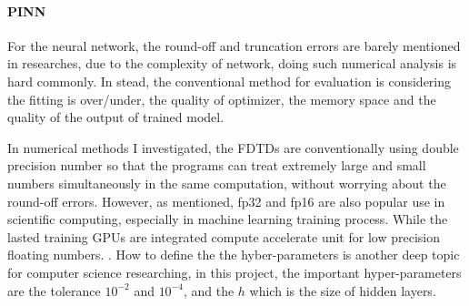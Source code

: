 \paragraph{PINN}
For the neural network, the round-off and truncation errors are barely mentioned in researches, 
due to the complexity of network, doing such numerical analysis is hard commonly.
In stead, the conventional method for evaluation is considering the fitting is over/under, the quality of optimizer, the memory space and the quality of 
the output of trained model.

In numerical methods I investigated, the FDTDs are conventionally using double precision number so that the programs can treat extremely large and small 
numbers simultaneously in the same computation, without worrying about the round-off errors.
However, as mentioned, fp32 and fp16 are also popular use in scientific computing, especially in machine learning training process. 
While the lasted training GPUs are integrated compute accelerate unit for low precision floating numbers. \cite{NVIDIA_HB200_PAPER}.
How to define the the hyber-parameters is another deep topic for computer science researching, in this project, 
the important hyper-parameters are the tolerance $10^{-2}$ and $10^{-4}$, and the $h$ which is the size of hidden layers.

